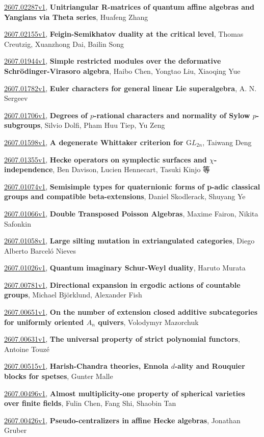 \documentclass[9pt, a4paper]{article}
\theoremstyle{plain}
\theoremstyle{definition}
\theoremstyle{remark}
\newcommand{\arxiv}[3]{\href{https://arxiv.org/abs/#1}{#1}, \textbf{\textcolor{arxivblue}{#2}}, #3}
\begin{document}
\arxiv{2607.02287v1}{Unitriangular R-matrices of quantum affine algebras and Yangians via Theta series}{Huafeng Zhang}

\arxiv{2607.02155v1}{Feigin-Semikhatov duality at the critical level}{Thomas Creutzig, Xuanzhong Dai, Bailin Song}

\arxiv{2607.01944v1}{Simple restricted modules over the deformative Schrödinger-Virasoro algebra}{Haibo Chen, Yongtao Liu, Xiaoqing Yue}

\arxiv{2607.01782v1}{Euler characters for general linear Lie superalgebra}{A. N. Sergeev}

\arxiv{2607.01706v1}{Degrees of $p$-rational characters and normality of Sylow $p$-subgroups}{Silvio Dolfi, Pham Huu Tiep, Yu Zeng}

\arxiv{2607.01598v1}{A degenerate Whittaker criterion for $\mathrm GL_{2n}$}{Taiwang Deng}

\arxiv{2607.01355v1}{Hecke operators on symplectic surfaces and $χ$-independence}{Ben Davison, Lucien Hennecart, Tasuki Kinjo 等}

\arxiv{2607.01074v1}{Semisimple types for quaternionic forms of p-adic classical groups and compatible beta-extensions}{Daniel Skodlerack, Shuyang Ye}

\arxiv{2607.01066v1}{Double Transposed Poisson Algebras}{Maxime Fairon, Nikita Safonkin}

\arxiv{2607.01058v1}{Large silting mutation in extriangulated categories}{Diego Alberto Barceló Nieves}

\arxiv{2607.01026v1}{Quantum imaginary Schur-Weyl duality}{Haruto Murata}

\arxiv{2607.00781v1}{Directional expansion in ergodic actions of countable groups}{Michael Björklund, Alexander Fish}

\arxiv{2607.00651v1}{On the number of extension closed additive subcategories for uniformly oriented $A_n$ quivers}{Volodymyr Mazorchuk}

\arxiv{2607.00631v1}{The universal property of strict polynomial functors}{Antoine Touzé}

\arxiv{2607.00515v1}{Harish-Chandra theories, Ennola $d$-ality and Rouquier blocks for spetses}{Gunter Malle}

\arxiv{2607.00496v1}{Almost multiplicity-one property of spherical varieties over finite fields}{Fulin Chen, Fang Shi, Shaobin Tan}

\arxiv{2607.00426v1}{Pseudo-centralizers in affine Hecke algebras}{Jonathan Gruber}
\end{document}
